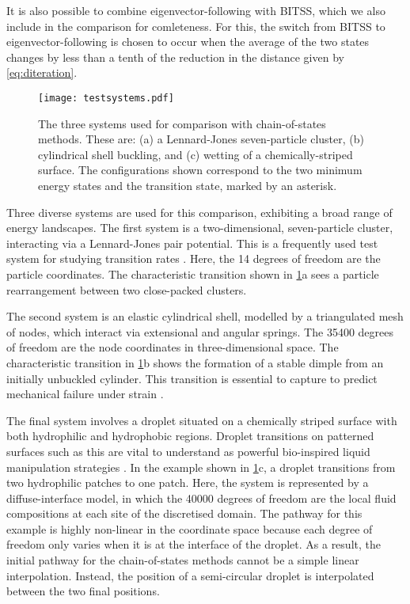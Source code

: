 \documentclass[aip,jcp,reprint,twocolumn]{revtex4-1}
\begin{document}
It is also possible to combine eigenvector-following with BITSS, which we also include in the comparison for comleteness.
For this, the switch from BITSS to eigenvector-following is chosen to occur when the average of the two states changes by less than a tenth of the reduction in the distance given by \cref{eq:diteration}.

\begin{figure}[tb]
  \texttt{[image: testsystems.pdf]}
  \caption{\label{fig:testsystems}
    The three systems used for comparison with chain-of-states methods.
    These are: (a) a Lennard-Jones seven-particle cluster, (b) cylindrical shell buckling, and (c) wetting of a chemically-striped surface.
    The configurations shown correspond to the two minimum energy states and the transition state, marked by an asterisk.
  }
\end{figure}

Three diverse systems are used for this comparison, exhibiting a broad range of energy landscapes.
The first system is a two-dimensional, seven-particle cluster, interacting via a Lennard-Jones pair potential.
This is a frequently used test system for studying transition rates \cite{Wales2002,Passerone2001}.
Here, the 14 degrees of freedom are the particle coordinates.
The characteristic transition shown in \cref{fig:testsystems}a sees a particle rearrangement between two close-packed clusters.

The second system is an elastic cylindrical shell, modelled by a triangulated mesh of nodes, which interact via extensional and angular springs.
The \num{35400} degrees of freedom are the node coordinates in three-dimensional space.
The characteristic transition in \cref{fig:testsystems}b shows the formation of a stable dimple from an initially unbuckled cylinder.
This transition is essential to capture to predict mechanical failure under strain \cite{Panter2019,Virot2017}.

The final system involves a droplet situated on a chemically striped surface with both hydrophilic and hydrophobic regions.
Droplet transitions on patterned surfaces such as this are vital to understand as powerful bio-inspired liquid manipulation strategies  \cite{Kusumaatmaja2006,Brown2016}.
In the example shown in \cref{fig:testsystems}c, a droplet transitions from two hydrophilic patches to one patch.
Here, the system is represented by a diffuse-interface model, in which the \num{40000} degrees of freedom are the local fluid compositions at each site of the discretised domain.
The pathway for this example is highly non-linear in the coordinate space because each degree of freedom only varies when it is at the interface of the droplet.
As a result, the initial pathway for the chain-of-states methods cannot be a simple linear interpolation.
Instead, the position of a semi-circular droplet is interpolated between the two final positions.
\end{document}
